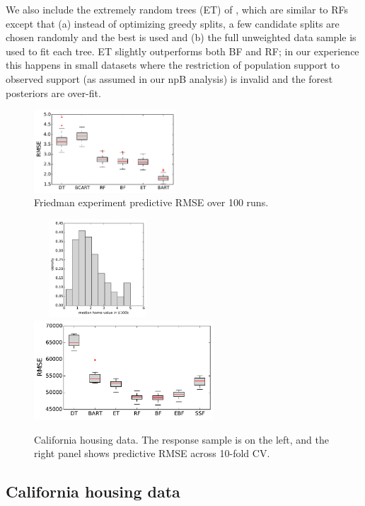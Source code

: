 \documentclass{article}
\begin{document}
We also include the extremely random trees (ET) of
\citet{geurts_extremely_2006}, which are similar to RFs except
that (a) instead of optimizing greedy splits, a few candidate splits are chosen
randomly and the best is used and (b) the full unweighted data sample is used to
fit each tree. ET slightly outperforms both BF and RF; in our experience this
happens in small datasets where the restriction of population support to
observed support (as assumed in our npB analysis) is invalid and the
forest posteriors are over-fit.


\begin{figure}
\includegraphics[width=0.475\textwidth]{../graphs/fried}
\caption{Friedman experiment predictive RMSE over 100 runs.}
\end{figure}


\begin{figure}
~~~\includegraphics[width=0.325\textwidth]{../graphs/ca_hist}
~~~~~~~
\includegraphics[width=0.6\textwidth]{../graphs/ca_rmse}
\caption{\label{calihist} California housing data. The response sample is on the left, and the right panel shows predictive RMSE across 10-fold CV.}
\end{figure}
    
\subsection{California housing data}\label{california-housing-data}
\end{document}

